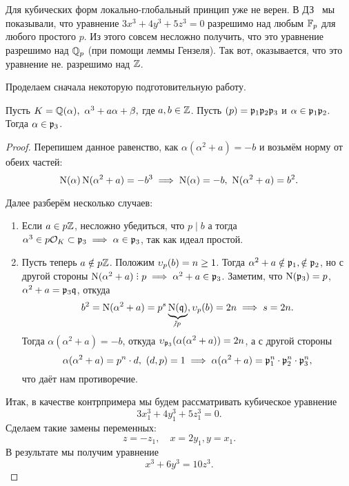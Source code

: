 	  	Для кубических форм локально-глобальный принцип уже не верен. В ДЗ~\label{hw:10} мы показывали, что уравнение $3x^3 + 4y^3 + 5z^3 = 0$ разрешимо над любым $\mathbb{F}_{p}$ для любого простого $p$. Из этого совсем несложно получить, что это уравнение разрешимо над $\mathbb{Q}_{p}$ (при помощи леммы Гензеля). Так вот, оказывается, что это уравнение не. разрешимо над $\mathbb{Z}$.

	  Проделаем сначала некоторую подготовительную работу. 

	  \begin{statement}[ДЗ 11, задача 3]\label{prop-alpha} 
	  	Пусть $K = \mathbb{Q}(\alpha), \ \alpha^3 + a \alpha + \beta,$ где $a, b \in \mathbb{Z}$. Пусть $(p) = \mathfrak{p}_1 \mathfrak{p}_2 \mathfrak{p}_3$ и $\alpha \in \mathfrak{p}_1 \mathfrak{p}_2$. Тогда $\alpha \in \mathfrak{p}_3$.
	  \end{statement}
	  \begin{proof}
	  	Перепишем данное равенство, как $\alpha(\alpha^2 + a) = - b$ и возьмём норму от обеих частей: 
	  	\[
	  		\operatorname{\mathrm{N}}(\alpha)\operatorname{\mathrm{N}}(\alpha^2 + a) = - b^3 \implies \operatorname{\mathrm{N}}(\alpha) = -b, \ \operatorname{\mathrm{N}}(\alpha^2 + a) = b^2. 
	  	\]

	  	Далее разберём несколько случаев: 
	  	\begin{enumerate}
	  		\item Если $a \in p\mathbb{Z}$, несложно убедиться, что $p \mid b$ а тогда $\alpha^3 \in p\mathcal{O}_{K} \subset \mathfrak{p}_{3} \implies \alpha \in \mathfrak{p}_{3}$, так как идеал простой. 

	  		\item Пусть теперь $a \notin p\mathbb{Z}$. Положим $\upsilon_{p}(b) = n \ge 1$. Тогда $\alpha^2 + a \notin \mathfrak{p}_1, \notin \mathfrak{p}_{2}$, но с другой стороны $\Nm(\alpha^2 + a) \divby p \implies \alpha^2 + a \in \fp_{3}$. Заметим, что $\operatorname{\mathrm{N}}(\mathfrak{p}_3) = p$, $\alpha^2 + a = \mathfrak{p}_{3} \mathfrak{q}$, откуда 
	  		\[
	  			b^2 = \Nm(\alpha^2 + a) = p^s \underbrace{\Nm(\fq)}_{\notdivby p}, \v_{p}(b) = 2n \implies s = 2n. 
	  		\]
	  		Тогда $\alpha(\alpha^2 + a) = -b$, откуда $\upsilon_{\mathfrak{p}_3}(\alpha(\alpha^2 + a)) = 2n$, а с другой стороны
	  		\[
	  		  	\alpha(\alpha^2 + a) = p^n \cdot d, \ (d, p ) = 1 \implies \alpha(\alpha^2 + a) = \mathfrak{p}_1^n \cdot \mathfrak{p}_2^n \cdot \mathfrak{p}_{3}^n,
	  		  \]  
	  		  что даёт нам противоречие. 
	  		
	  	\end{enumerate}




	  	Итак, в качестве контрпримера мы будем рассматривать кубическое уравнение 
	  	\[
	  		3x_1^3 + 4y_1^3 + 5z_1^3 = 0.
	  	\]
	  	Сделаем такие замены переменных: 
	  	\[
	  		z = -z_1, \quad x = 2y_1, y = x_1.
	  	\]
	  	В результате мы получим уравнение 
	  	\[
	  		x^3 + 6y^3 = 10z^3.
	  	\]


\end{proof}
